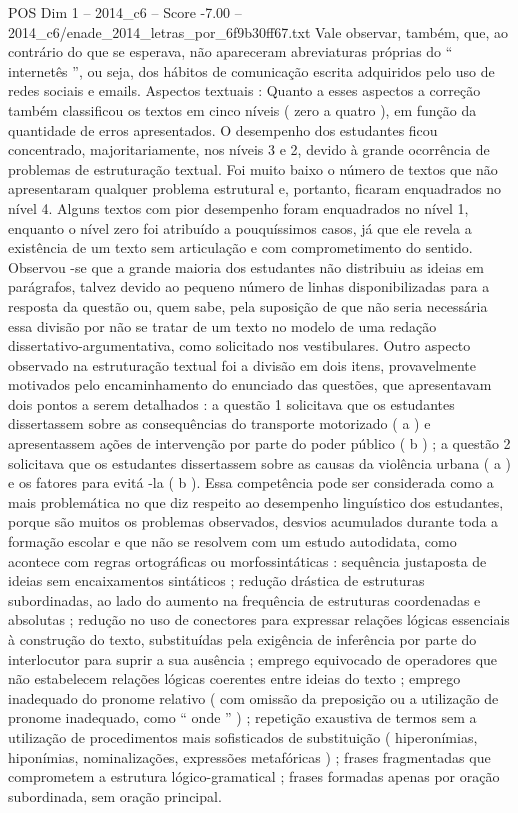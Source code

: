 \begin{textsample}{POS Dim 1 – 2014\_c6 – Score -7.00 – 2014\_c6/enade\_2014\_letras\_por\_6f9b30ff67.txt}
Vale observar, também, que, ao contrário do que se esperava, não apareceram abreviaturas próprias do “ internetês ”, ou seja, dos hábitos de comunicação escrita adquiridos pelo uso de redes sociais e emails.
Aspectos textuais : Quanto a esses aspectos a correção também classificou os textos em cinco níveis ( zero a quatro ), em função da quantidade de erros apresentados.
O desempenho dos estudantes ficou concentrado, majoritariamente, nos níveis 3 e 2, devido à grande ocorrência de problemas de estruturação textual.
Foi muito baixo o número de textos que não apresentaram qualquer problema estrutural e, portanto, ficaram enquadrados no nível 4.
Alguns textos com pior desempenho foram enquadrados no nível 1, enquanto o nível zero foi atribuído a pouquíssimos casos, já que ele revela a existência de um texto sem articulação e com comprometimento do sentido.
Observou -se que a grande maioria dos estudantes não distribuiu as ideias em parágrafos, talvez devido ao pequeno número de linhas disponibilizadas para a resposta da questão ou, quem sabe, pela suposição de que não seria necessária essa divisão por não se tratar de um texto no modelo de uma redação dissertativo-argumentativa, como solicitado nos vestibulares.
Outro aspecto observado na estruturação textual foi a divisão em dois itens, provavelmente motivados pelo encaminhamento do enunciado das questões, que apresentavam dois pontos a serem detalhados : a questão 1 solicitava que os estudantes dissertassem sobre as consequências do transporte motorizado ( a ) e apresentassem ações de intervenção por parte do poder público ( b ) ; a questão 2 solicitava que os estudantes dissertassem sobre as causas da violência urbana ( a ) e os fatores para evitá -la ( b ).
Essa competência pode ser considerada como a mais problemática no que diz respeito ao desempenho linguístico dos estudantes, porque são muitos os problemas observados, desvios acumulados durante toda a formação escolar e que não se resolvem com um estudo autodidata, como acontece com regras ortográficas ou morfossintáticas : sequência justaposta de ideias sem encaixamentos sintáticos ; redução drástica de estruturas subordinadas, ao lado do aumento na frequência de estruturas coordenadas e absolutas ; redução no uso de conectores para expressar relações lógicas essenciais à construção do texto, substituídas pela exigência de inferência por parte do interlocutor para suprir a sua ausência ; emprego equivocado de operadores que não estabelecem relações lógicas coerentes entre ideias do texto ; emprego inadequado do pronome relativo ( com omissão da preposição ou a utilização de pronome inadequado, como “ onde ” ) ; repetição exaustiva de termos sem a utilização de procedimentos mais sofisticados de substituição ( hiperonímias, hiponímias, nominalizações, expressões metafóricas ) ; frases fragmentadas que comprometem a estrutura lógico-gramatical ; frases formadas apenas por oração subordinada, sem oração principal.

\end{textsample}
